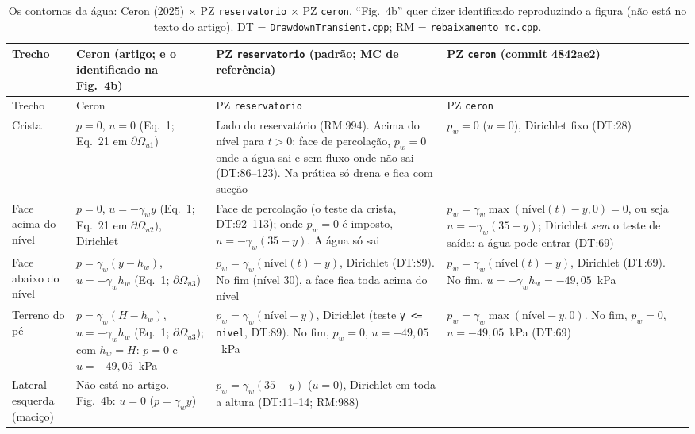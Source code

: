 \documentclass[11pt,a4paper]{article}
\newcommand{\gw}{\gamma_w}
\begin{document}
\begin{landscape}
\footnotesize
\setlength{\tabcolsep}{4pt}\setlength{\LTcapwidth}{\linewidth}
\begin{longtable}{>{\raggedright}p{2.6cm}>{\raggedright}p{6.6cm}>{\raggedright}p{7.0cm}>{\raggedright\arraybackslash}p{6.4cm}}
\caption{Os contornos da água: Ceron (2025) $\times$ PZ \texttt{reservatorio} $\times$ PZ \texttt{ceron}. ``Fig.~4b''
quer dizer identificado reproduzindo a figura (não está no texto do artigo). DT = \texttt{DrawdownTransient.cpp};
RM = \texttt{rebaixamento\_mc.cpp}.}\label{tab:unica}\\
\toprule
Trecho & Ceron (artigo; e o identificado na Fig.~4b) & PZ \texttt{reservatorio} (padrão; MC de referência) & PZ \texttt{ceron} (commit 4842ae2) \\
\midrule\endfirsthead
\toprule
Trecho & Ceron & PZ \texttt{reservatorio} & PZ \texttt{ceron} \\
\midrule\endhead
\bottomrule\endfoot
Crista & $p = 0$, $u = 0$ (Eq.~1; Eq.~21 em $\partial\Omega_{u1}$) &
  Lado do reservatório (RM:994). Acima do nível para $t > 0$: face de percolação, $p_w = 0$ onde a água sai e sem fluxo
  onde não sai (DT:86--123). Na prática só drena e fica com sucção &
  $p_w = 0$ ($u = 0$), Dirichlet fixo (DT:28) \\ \midrule
Face acima do nível & $p = 0$, $u = -\gw y$ (Eq.~1; Eq.~21 em $\partial\Omega_{u2}$), Dirichlet &
  Face de percolação (o teste da crista, DT:92--113); onde $p_w = 0$ é imposto, $u = -\gw(35 - y)$. A água só sai &
  $p_w = \gw\max(\text{nível}(t) - y, 0) = 0$, ou seja $u = -\gw(35 - y)$; Dirichlet \emph{sem} o teste de saída: a
  água pode entrar (DT:69) \\ \midrule
Face abaixo do nível & $p = \gw(y - h_w)$, $u = -\gw h_w$ (Eq.~1; $\partial\Omega_{u3}$) &
  $p_w = \gw(\text{nível}(t) - y)$, Dirichlet (DT:89). No fim (nível 30), a face fica toda acima do nível &
  $p_w = \gw(\text{nível}(t) - y)$, Dirichlet (DT:69). No fim, $u = -\gw h_w = -49{,}05$~kPa \\ \midrule
Terreno do pé & $p = \gw(H - h_w)$, $u = -\gw h_w$ (Eq.~1; $\partial\Omega_{u3}$); com $h_w = H$: $p = 0$ e
  $u = -49{,}05$~kPa &
  $p_w = \gw(\text{nível} - y)$, Dirichlet (teste \texttt{y <= nivel}, DT:89). No fim, $p_w = 0$, $u = -49{,}05$~kPa &
  $p_w = \gw\max(\text{nível} - y, 0)$. No fim, $p_w = 0$, $u = -49{,}05$~kPa (DT:69) \\ \midrule
Lateral esquerda (maciço) & Não está no artigo. Fig.~4b: $u = 0$ ($p = \gw y$) &
  $p_w = \gw(35 - y)$ ($u = 0$), Dirichlet em toda a altura (DT:11--14; RM:988) &

\end{longtable}
\end{landscape}
\end{document}
